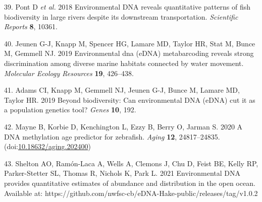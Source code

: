 \documentclass[
]{article}
\begin{document}
\leavevmode\hypertarget{ref-pont2018environmental}{}%
39. Pont D \emph{et al.} 2018 Environmental DNA reveals quantitative
patterns of fish biodiversity in large rivers despite its downstream
transportation. \emph{Scientific Reports} \textbf{8}, 10361.

\leavevmode\hypertarget{ref-jeunen2019environmental}{}%
40. Jeunen G-J, Knapp M, Spencer HG, Lamare MD, Taylor HR, Stat M, Bunce
M, Gemmell NJ. 2019 Environmental dna (eDNA) metabarcoding reveals
strong discrimination among diverse marine habitats connected by water
movement. \emph{Molecular Ecology Resources} \textbf{19}, 426--438.

\leavevmode\hypertarget{ref-adams2019beyond}{}%
41. Adams CI, Knapp M, Gemmell NJ, Jeunen G-J, Bunce M, Lamare MD,
Taylor HR. 2019 Beyond biodiversity: Can environmental DNA (eDNA) cut it
as a population genetics tool? \emph{Genes} \textbf{10}, 192.

\leavevmode\hypertarget{ref-mayne2020aging}{}%
42. Mayne B, Korbie D, Kenchington L, Ezzy B, Berry O, Jarman S. 2020 A
DNA methylation age predictor for zebrafish. \emph{Aging} \textbf{12},
24817--24835.
(doi:\href{https://doi.org/10.18632/aging.202400}{10.18632/aging.202400})

\leavevmode\hypertarget{ref-shelton2021data}{}%
43. Shelton AO, Ram\'on-Laca A, Wells A, Clemons J, Chu D, Feist BE, Kelly RP,
Parker-Stetter SL, Thomas R, Nichols K, Park L. 2021 Environmental DNA provides 
quantitative estimates of abundance and distribution in the open ocean. Available at:
https://github.com/nwfsc-cb/eDNA-Hake-public/releases/tag/v1.0.2
\end{document}
